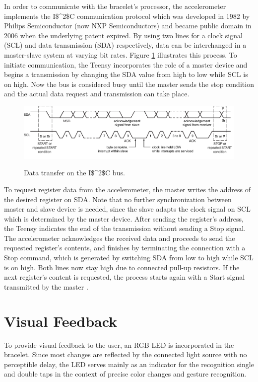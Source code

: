 In order to communicate with the bracelet's processor, the accelerometer implements the \ac{I$^2$C} communication protocol which was developed in 1982 by Philips Semiconductor (now NXP Semiconductors) and became public domain in 2006 when the underlying patent expired. By using two lines for a clock signal (\textsc{SCL}) and data transmission (\textsc{SDA}) respectively, data can be interchanged in a master-slave system at varying bit rates. Figure \ref{fig:i2c} illustrates this process. To initiate communication, the Teensy incorporates the role of a master device and begins a transmission by changing the \textsc{SDA} value from high to low while \textsc{SCL} is on high. Now the bus is considered busy until the master sends the stop condition and the actual data request and transmission can take place.

\begin{figure}[bth]
	\myfloatalign
	\includegraphics[width=\linewidth]{gfx/i2c.pdf}
	\label{fig:i2c}
	\caption{Data transfer on the \ac{I$^2$C} bus. \cite{i2c}}
\end{figure}

To request register data from the accelerometer, the master writes the address of the desired register on \textsc{SDA}. Note that no further synchronization between master and slave device is needed, since the slave adapts the clock signal on \textsc{SCL} which is determined by the master device. After sending the register's address, the Teensy indicates the end of the transmission without sending a Stop signal. The accelerometer acknowledges the received data and proceeds to send the requested register's contents, and finishes by terminating the connection with a Stop command, which is generated by switching \textsc{SDA} from low to high while \textsc{SCL} is on high. Both lines now stay high due to connected pull-up resistors. If the next register's content is requested, the process starts again with a Start signal transmitted by the master \cite{i2c}.

\section{Visual Feedback}
To provide visual feedback to the user, an \textsc{RGB} \ac{LED} is incorporated in the bracelet. Since most changes are reflected by the connected light source with no perceptible delay, the \ac{LED} serves mainly as an indicator for the recognition single and double taps in the context of precise color changes and gesture recognition.